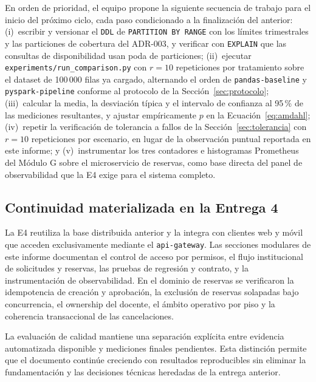 \documentclass[10pt,twocolumn]{article}
\begin{document}
En orden de prioridad, el equipo propone la siguiente secuencia de trabajo
para el inicio del próximo ciclo, cada paso condicionado a la finalización
del anterior: (i)~escribir y versionar el \texttt{DDL} de
\texttt{PARTITION BY RANGE} con los límites trimestrales y las particiones
de cobertura del ADR-003, y verificar con \texttt{EXPLAIN} que las
consultas de disponibilidad usan poda de particiones; (ii)~ejecutar
\texttt{experiments/run\_comparison.py} con $r=10$ repeticiones por
tratamiento sobre el dataset de 100\,000 filas ya cargado, alternando el
orden de \texttt{pandas-baseline} y \texttt{pyspark-pipeline} conforme al
protocolo de la Sección~\ref{sec:protocolo}; (iii)~calcular la media, la
desviación típica y el intervalo de confianza al 95\,\% de las mediciones
resultantes, y ajustar empíricamente $p$ en la Ecuación~\eqref{eq:amdahl};
(iv)~repetir la verificación de tolerancia a fallos de la
Sección~\ref{sec:tolerancia} con $r=10$ repeticiones por escenario, en
lugar de la observación puntual reportada en este informe; y
(v)~instrumentar los tres contadores e histogramas Prometheus del Módulo G
sobre el microservicio de reservas, como base directa del panel de
observabilidad que la E4 exige para el sistema completo.

\subsection{Continuidad materializada en la Entrega 4}

La E4 reutiliza la base distribuida anterior y la integra con clientes web
y móvil que acceden exclusivamente mediante el \texttt{api-gateway}. Las
secciones modulares de este informe documentan el control de acceso por
permisos, el flujo institucional de solicitudes y reservas, las pruebas de
regresión y contrato, y la instrumentación de observabilidad. En el dominio
de reservas se verificaron la idempotencia de creación y aprobación, la
exclusión de reservas solapadas bajo concurrencia, el ownership del docente,
el ámbito operativo por piso y la coherencia transaccional de las
cancelaciones.

La evaluación de calidad mantiene una separación explícita entre evidencia
automatizada disponible y mediciones finales pendientes. Esta distinción
permite que el documento continúe creciendo con resultados reproducibles
sin eliminar la fundamentación y las decisiones técnicas heredadas de la
entrega anterior.



\end{document}
